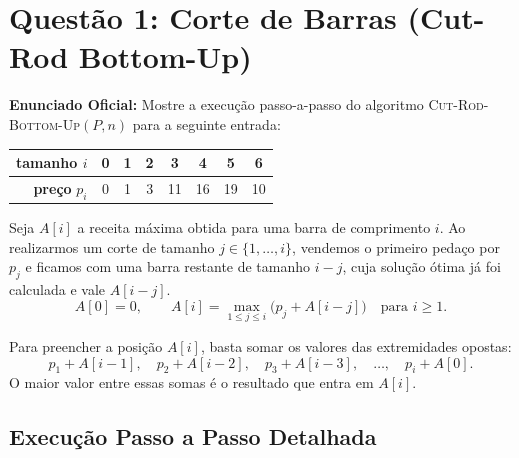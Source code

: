 \documentclass[11pt,a4paper]{article}
\begin{document}
\vspace{0.4cm}

\section*{Questão 1: Corte de Barras (Cut-Rod Bottom-Up)}

\textbf{Enunciado Oficial:} Mostre a execução passo-a-passo do algoritmo \textsc{Cut-Rod-Bottom-Up}$(P, n)$ para a seguinte entrada:
\begin{center}
\begin{tabular}{r|ccccccc}
\toprule
\textbf{tamanho} $i$ & 0 & 1 & 2 & 3 & 4 & 5 & 6 \\
\midrule
\textbf{preço} $p_i$ & 0 & 1 & 3 & 11 & 16 & 19 & 10 \\
\bottomrule
\end{tabular}
\end{center}

\begin{teoria}
Seja $A[i]$ a receita máxima obtida para uma barra de comprimento $i$. Ao realizarmos um corte de tamanho $j \in \{1, \dots, i\}$, vendemos o primeiro pedaço por $p_j$ e ficamos com uma barra restante de tamanho $i - j$, cuja solução ótima já foi calculada e vale $A[i - j]$.
\[
A[0] = 0, \qquad A[i] = \max_{1 \le j \le i} \Big( p_j + A[i - j] \Big) \quad \text{para } i \ge 1.
\]
\end{teoria}

\begin{dica}
Para preencher a posição $A[i]$, basta somar os valores das extremidades opostas:
\[
p_1 + A[i-1], \quad p_2 + A[i-2], \quad p_3 + A[i-3], \quad \dots, \quad p_i + A[0].
\]
O maior valor entre essas somas é o resultado que entra em $A[i]$.
\end{dica}

\subsection*{Execução Passo a Passo Detalhada}
\end{document}
